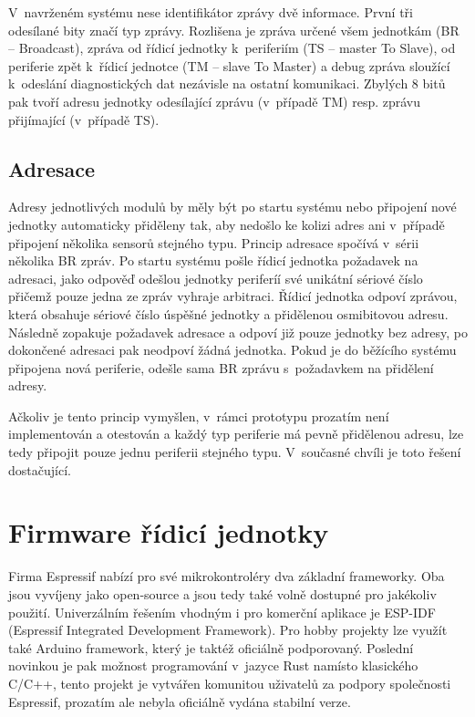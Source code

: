     V~navrženém systému nese identifikátor zprávy dvě informace. První tři odesílané bity značí typ zprávy. Rozlišena je zpráva určené všem jednotkám (BR -- Broadcast), zpráva od řídicí jednotky k~periferiím (TS -- master To Slave), od periferie zpět k~řídicí jednotce (TM -- slave To Master) a debug zpráva sloužící k~odeslání diagnostických dat nezávisle na ostatní komunikaci. Zbylých 8 bitů pak tvoří adresu jednotky odesílající zprávu (v~případě TM) resp. zprávu přijímající (v~případě TS). 
    
    \subsection{Adresace}
    Adresy jednotlivých modulů by měly být po startu systému nebo připojení nové jednotky automaticky přiděleny tak, aby nedošlo ke kolizi adres ani v~případě připojení několika sensorů stejného typu. Princip adresace spočívá v~sérii několika BR zpráv. Po startu systému pošle řídicí jednotka požadavek na adresaci, jako odpověď odešlou jednotky periferíí své unikátní sériové číslo přičemž pouze jedna ze zpráv vyhraje arbitraci. Řídicí jednotka odpoví zprávou, která obsahuje sériové číslo úspěšné jednotky a přidělenou osmibitovou adresu. Následně zopakuje požadavek adresace a odpoví již pouze jednotky bez adresy, po dokončené adresaci pak neodpoví žádná jednotka. Pokud je do běžícího systému připojena nová periferie, odešle sama BR zprávu s~požadavkem na přidělení adresy.

    Ačkoliv je tento princip vymyšlen, v~rámci prototypu prozatím není implementován a otestován a každý typ periferie má pevně přidělenou adresu, lze tedy připojit pouze jednu periferii stejného typu. V~současné chvíli je toto řešení dostačující.



\section{Firmware řídicí jednotky}
    Firma Espressif nabízí pro své mikrokontroléry dva základní frameworky. Oba jsou vyvíjeny jako open-source a jsou tedy také volně dostupné pro jakékoliv použití. Univerzálním řešením vhodným i pro komerční aplikace je ESP-IDF (Espressif Integrated Development Framework). Pro hobby projekty lze využít také Arduino framework, který je taktéž oficiálně podporovaný. Poslední novinkou je pak možnost programování v~jazyce Rust namísto klasického C/C++, tento projekt je vytvářen komunitou uživatelů za podpory společnosti Espressif, prozatím ale nebyla oficiálně vydána stabilní verze. 

